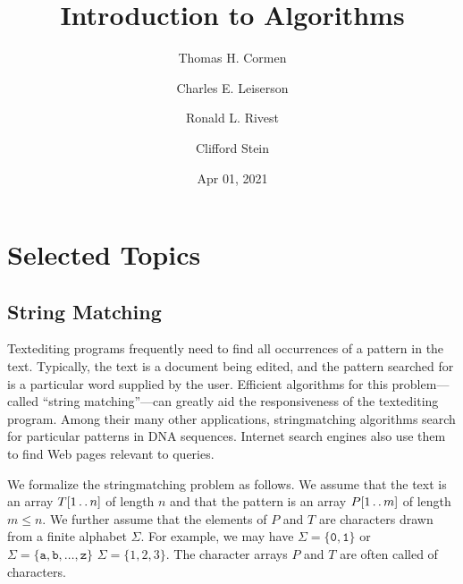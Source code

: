 \documentclass[a4paper,10pt,english]{sphinxmanual}
\title{Introduction to Algorithms}
\date{Apr 01, 2021}
\author{Thomas H. Cormen\and Charles E. Leiserson\and Ronald L. Rivest\and Clifford Stein}
\begin{document}
\pagestyle{empty}
\sphinxmaketitle
\pagestyle{plain}
\sphinxtableofcontents
\pagestyle{normal}
\label{\detokenize{index::doc}}



\part{Selected Topics}
\label{\detokenize{part7/index:selected-topics}}\label{\detokenize{part7/index:part7}}\label{\detokenize{part7/index::doc}}

\chapter{String Matching}
\label{\detokenize{part7/ch32/index:string-matching}}\label{\detokenize{part7/ch32/index:ch32}}\label{\detokenize{part7/ch32/index::doc}}
\sphinxAtStartPar
Text\sphinxhyphen{}editing programs frequently need to find all occurrences of a pattern in
the text. Typically, the text is a document being edited, and the pattern
searched for is a particular word supplied by the user. Efficient algorithms
for this problem—called “string matching”—can greatly aid the responsiveness of
the text\sphinxhyphen{}editing program. Among their many other applications, string\sphinxhyphen{}matching
algorithms search for particular patterns in DNA sequences. Internet search
engines also use them to find Web pages relevant to queries.

\sphinxAtStartPar
We formalize the string\sphinxhyphen{}matching problem as follows. We assume that the text is
an array \(T[1 \mathinner{\ldotp\ldotp} n]\) of length \(n\) and that the pattern is an
array \(P[1 \mathinner{\ldotp\ldotp} m]\) of length \(m \le n\). We further assume that
the elements of \(P\) and \(T\) are characters drawn from a finite
alphabet \(\Sigma\). For example, we may have
\(\Sigma = \{ \mathtt{0} , \mathtt{1}\}\) or
\(\Sigma = \{ \mathtt{a,b,\ldots,z} \}\) \(\Sigma = \{ 1,2,3 \}\). The
character arrays \(P\) and \(T\) are often called 
of characters.



\renewcommand{\indexname}{Index}
\printindex
\end{document}
